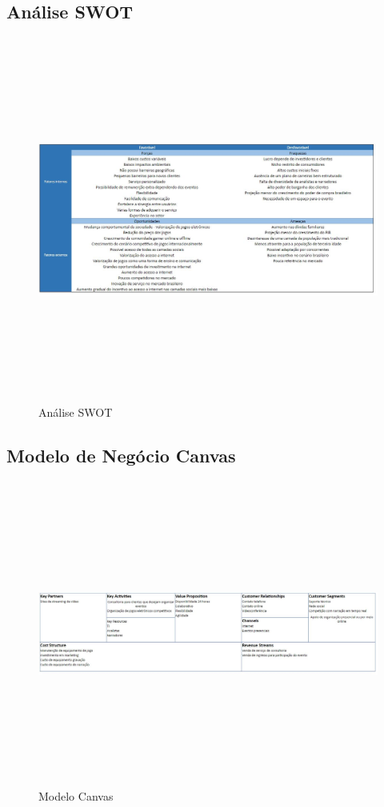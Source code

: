 \documentclass[a4paper, 12pt]{paper}
\begin{document}
\newpage

\begin{landscape}
\subsection{Análise SWOT}
    \begin{figure}[!ht]
        \centering
        \includegraphics[width=25cm,height=12cm]{img/img06.png}
        \caption{Análise SWOT}
    \end{figure}
\newpage
\subsection{Modelo de Negócio Canvas}
\begin{figure}[!ht]
    \centering
    \includegraphics[width=25cm,height=10cm]{img/img07.png}
    \caption{Modelo Canvas}
\end{figure}
\newpage

\end{landscape}
\end{document}
